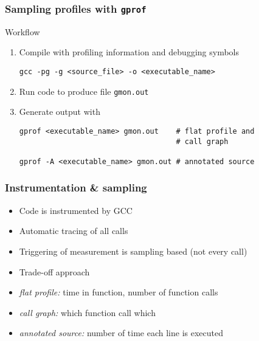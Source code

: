 \documentclass[dvipsnames,presentation,aspectratio=169,14pt]{beamer}
\begin{document}
\begin{frame}[fragile]
  \frametitle{Sampling profiles with \texttt{gprof}}
  \begin{exampleblock}{Workflow}
    \begin{enumerate}[leftmargin=18pt, itemsep=10pt]
    \item Compile with profiling information and debugging symbols
\begin{verbatim}
gcc -pg -g <source_file> -o <executable_name>
\end{verbatim}
    \item Run code to produce file \texttt{gmon.out}
    \item Generate output with
\begin{verbatim}
gprof <executable_name> gmon.out    # flat profile and
                                    # call graph

gprof -A <executable_name> gmon.out # annotated source
\end{verbatim}
    \end{enumerate}
  \end{exampleblock}
\end{frame}

\begin{frame}
  \frametitle{Instrumentation \& sampling}
  \begin{itemize}[itemsep=5pt]
  \item Code is instrumented by GCC
  \item Automatic tracing of all calls
  \item Triggering of measurement is sampling based (not every call)
  \item Trade-off approach
  \end{itemize}
  \vskip 5pt

  \begin{itemize}[itemsep=5pt]
  \item \emph{flat profile:} time in function, number of function calls
  \item \emph{call graph:} which function call which
  \item \emph{annotated source:} number of time each line is executed
  \end{itemize}

\end{frame}
\end{document}
